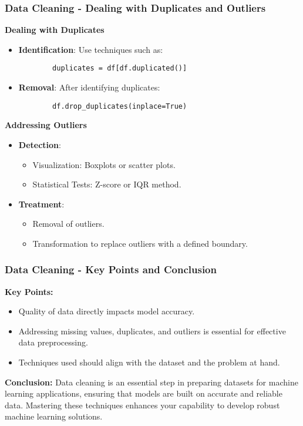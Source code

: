 \documentclass[aspectratio=169]{beamer}
\begin{document}
\begin{frame}[fragile]
    \frametitle{Data Cleaning - Dealing with Duplicates and Outliers}
    \textbf{Dealing with Duplicates}
    \begin{itemize}
        \item \textbf{Identification}: Use techniques such as:
        \begin{lstlisting}
        duplicates = df[df.duplicated()]
        \end{lstlisting}
        \item \textbf{Removal}: After identifying duplicates:
        \begin{lstlisting}
        df.drop_duplicates(inplace=True)
        \end{lstlisting}
    \end{itemize}

    \textbf{Addressing Outliers}
    \begin{itemize}
        \item \textbf{Detection}:
            \begin{itemize}
                \item Visualization: Boxplots or scatter plots.
                \item Statistical Tests: Z-score or IQR method.
            \end{itemize}
        \item \textbf{Treatment}:
            \begin{itemize}
                \item Removal of outliers.
                \item Transformation to replace outliers with a defined boundary.
            \end{itemize}
    \end{itemize}
\end{frame}

\begin{frame}[fragile]
    \frametitle{Data Cleaning - Key Points and Conclusion}
    \textbf{Key Points:}
    \begin{itemize}
        \item Quality of data directly impacts model accuracy.
        \item Addressing missing values, duplicates, and outliers is essential for effective data preprocessing.
        \item Techniques used should align with the dataset and the problem at hand.
    \end{itemize}

    \textbf{Conclusion:}
    Data cleaning is an essential step in preparing datasets for machine learning applications, ensuring that models are built on accurate and reliable data. Mastering these techniques enhances your capability to develop robust machine learning solutions.
\end{frame}
\end{document}
